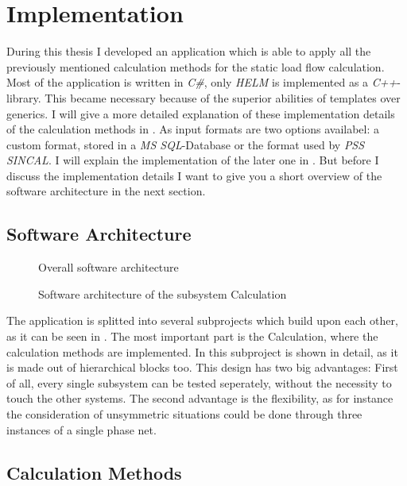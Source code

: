 \chapter{Implementation}
During this thesis I developed an application which is able to apply all the previously mentioned calculation methods for the static load flow calculation. Most of the application is written in \emph{C\#}, only \emph{HELM} is implemented as a \emph{C++}-library. This became necessary because of the superior abilities of templates over generics. I will give a more detailed explanation of these implementation details of the calculation methods in .
As input formats are two options availabel: a custom format, stored in a \emph{MS SQL}-Database or the format used by \emph{PSS SINCAL}. I will explain the implementation of the later one in . But before I discuss the implementation details I want to give you a short overview of the software architecture in the next section.

\section{Software Architecture}

\begin{figure}
	\centering
	
	\caption{Overall software architecture}
	\label{fig:software_architecture}
\end{figure}

\begin{figure}
	\centering
	
	\caption{Software architecture of the subsystem Calculation}
	\label{fig:calculation_architecture}
\end{figure}

The application is splitted into several subprojects which build upon each other, as it can be seen in . The most important part is the Calculation, where the calculation methods are implemented. In  this subproject is shown in detail, as it is made out of hierarchical blocks too. This design has two big advantages: First of all, every single subsystem can be tested seperately, without the necessity to touch the other systems. The second advantage is the flexibility, as for instance the consideration of unsymmetric situations could be done through three instances of a single phase net.

\section{Calculation Methods}
\label{sec:implementation_calculation_methods}

